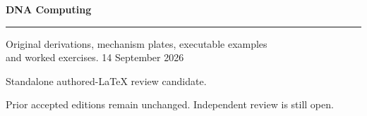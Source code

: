 \documentclass[11pt,oneside,openany]{book}
\begin{document}
\frontmatter
\begin{titlepage}
\color{Blue}\sffamily\vspace*{20mm}
{\Huge\bfseries DNA Computing\par}
\vspace{10mm}{\LARGE Chapter 4\par}
\vspace{8mm}{\Large Molecular parallelism and resource accounting\par}
\vspace{12mm}\rule{\linewidth}{.8pt}
\vspace{6mm}\par Original derivations, mechanism plates, executable examples\\and worked exercises.
\vfill 14 September 2026\par
Standalone authored-LaTeX review candidate.\par
Prior accepted editions remain unchanged. Independent review is still open.
\end{titlepage}
\tableofcontents
\mainmatter
\setcounter{chapter}{3}

\backmatter

\printindex
\end{document}
